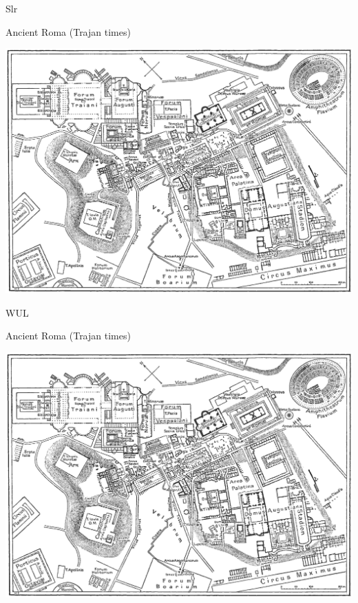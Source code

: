 \documentclass[print,Draft]{faosyb}
\begin{document}
\begin{map}{S}{lr}
\caption{Ancient Roma \newline (Trajan times)}
\label{map:roma}
\includegraphics[width=\chartwidth,height=\chartheight]{Rome}
\end{map}


\begin{map}{W}{UL}
\caption{Ancient Roma \newline (Trajan times)}
\label{map:roma}
\includegraphics[width=\chartwidth,height=\chartheight]{Rome}
\end{map}
\end{document}
